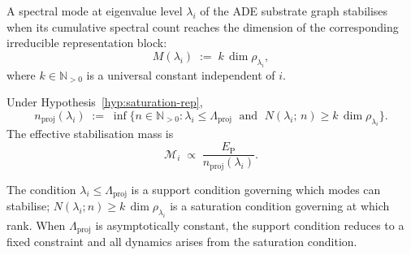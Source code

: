     \begin{hypothesis}
      \label{hyp:saturation-rep}
      A spectral mode at eigenvalue level $\lambda_i$ of the ADE substrate graph
      stabilises when its cumulative spectral count reaches the dimension of the
      corresponding irreducible representation block:
      \begin{equation}
        \label{eq:saturation-condition}
        M(\lambda_i) \;:=\; k\,\dim \rho_{\lambda_i},
      \end{equation}
      where $k \in \mathbb{N}_{>0}$ is a universal constant independent of $i$.
    \end{hypothesis}

    \begin{definition}
      \label{def:nproj}
      Under Hypothesis~\ref{hyp:saturation-rep},
      \begin{equation}
        \label{eq:nproj-def}
        n_{\mathrm{proj}}(\lambda_i)
        \;:=\; \inf\bigl\{n \in \mathbb{N}_{>0} :
        \lambda_i \leq \Lambda_{\mathrm{proj}}
        \;\text{ and }\;
        N(\lambda_i;\, n) \geq k\,\dim\rho_{\lambda_i}
        \bigr\}.
      \end{equation}
      The effective stabilisation mass is
      \begin{equation}
        \label{eq:mass-def}
        \mathcal{M}_i \;\propto\; \frac{E_{\mathrm{P}}}{n_{\mathrm{proj}}(\lambda_i)}.
      \end{equation}
    \end{definition}

    \begin{remark}
  The condition $\lambda_i \leq \Lambda_{\mathrm{proj}}$ is a support condition
  governing which modes can stabilise; $N(\lambda_i; n) \geq k\,\dim\rho_{\lambda_i}$
  is a saturation condition governing at which rank.
  When $\Lambda_{\mathrm{proj}}$ is asymptotically constant, the support
  condition reduces to a fixed constraint and all dynamics arises from the
  saturation condition.
    \end{remark}
